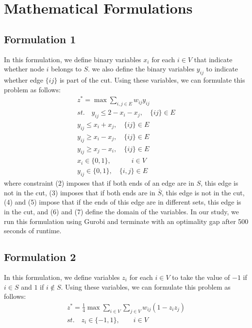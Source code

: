 \documentclass[12pt]{article}
\theoremstyle{plain}
\theoremstyle{definition}
\begin{document}
\section{Mathematical Formulations}\label{sec:Formulations}
\subsection{Formulation 1}\label{subsec:Formulation1}
In this formulation, we define binary variables $x_{i}$ for each $i \in V$ that indicate whether node $i$ belongs to $S$. we also define the binary variables $y_{ij}$ to indicate whether edge $\lbrace ij \rbrace$ is part of the cut.
Using these variables, we can formulate this problem as follows:
\begin{align}
     z^* = \max \sum_{i,j \in E} w_{ij}y_{ij} \\st.\quad y_{ij} \leq 2 - x_i - x_j,\quad \lbrace ij \rbrace \in E \\ y_{ij} \leq x_i + x_j,\quad \lbrace ij \rbrace \in E \\ y_{ij} \geq x_i - x_j,\quad \lbrace ij \rbrace \in E \\ y_{ij} \geq x_j - x_i,\quad \lbrace ij \rbrace \in E \\ x_i \in \lbrace 0,1 \rbrace, \quad \quad \quad i \in V \\ y_{ij} \in \lbrace 0,1 \rbrace, \quad \lbrace i,j \rbrace \in E
\end{align}
where constraint (2) imposes that if both ends of an edge are in $S$, this edge is not in the cut, (3) imposes that if both ends are in $\bar{S}$, this edge is not in the cut, (4) and (5) impose that if the ends of this edge are in different sets, this edge is in the cut, and (6) and (7) define the domain of the variables.  In our study, we run this formulation using Gurobi and terminate with an optimality gap after 500 seconds of runtime.

\subsection{Formulation 2}\label{subsec:Forulation2}
In this formulation, we define variables $z_i$ for each $i \in V$ to take the value of $-1$ if $i \in S$ and $1$ if $i \notin S$. Using these variables, we can formulate this problem as follows:
\begin{align}
     z^* = \frac{1}{4}\max \sum_{i \in V} \sum_{j \in V} w_{ij} (1 - z_i z_j) \\ st.\quad z_i \in \lbrace -1,1 \rbrace, \quad \quad i \in V 
\end{align}
\end{document}
